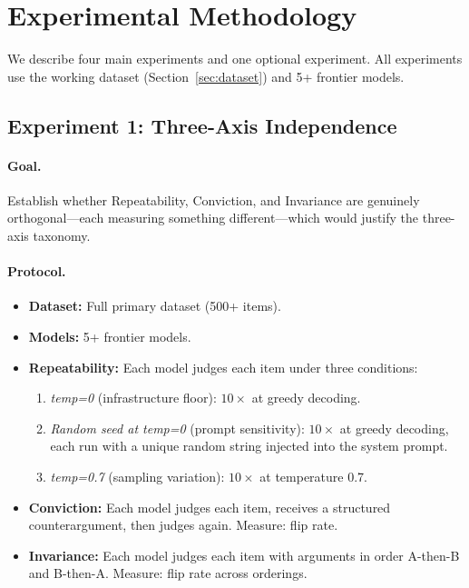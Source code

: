 \section{Experimental Methodology}
\label{sec:experiments}

We describe four main experiments and one optional experiment. All experiments use the working dataset (Section~\ref{sec:dataset}) and 5+ frontier models.

\subsection{Experiment 1: Three-Axis Independence}
\label{sec:exp1}

\paragraph{Goal.} Establish whether Repeatability, Conviction, and Invariance are genuinely orthogonal---each measuring something different---which would justify the three-axis taxonomy.

\paragraph{Protocol.}
\begin{itemize}
    \item \textbf{Dataset:} Full primary dataset (500+ items).
    \item \textbf{Models:} 5+ frontier models.
    \item \textbf{Repeatability:} Each model judges each item under three conditions:
    \begin{enumerate}
        \item \emph{temp=0} (infrastructure floor): $10\times$ at greedy decoding.
        \item \emph{Random seed at temp=0} (prompt sensitivity): $10\times$ at greedy decoding, each run with a unique random string injected into the system prompt.
        \item \emph{temp=0.7} (sampling variation): $10\times$ at temperature 0.7.
    \end{enumerate}
    \item \textbf{Conviction:} Each model judges each item, receives a structured counterargument, then judges again. Measure: flip rate.
    \item \textbf{Invariance:} Each model judges each item with arguments in order A-then-B and B-then-A. Measure: flip rate across orderings.
\end{itemize}

